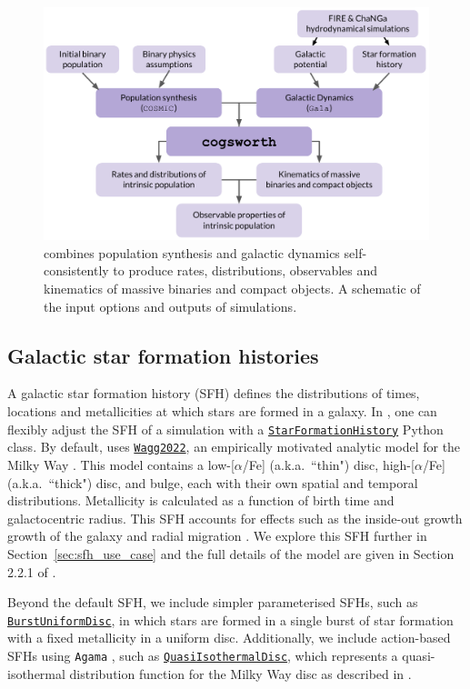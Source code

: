 \documentclass[twocolumn, twocolappendix, oneside]{aastex631}
\newcommand{\codeLink}[2]{{\href{https://cogsworth.readthedocs.io/en/latest/api/cogsworth.#2.#1.html}{\color{codecolour} \texttt{#1}}}}
\begin{document}
\begin{figure}
    \centering
    \includegraphics[width=\columnwidth]{figures/cogsworth_workflow_paper.pdf}
    \caption{\cogsworth combines population synthesis and galactic dynamics self-consistently to produce rates, distributions, observables and kinematics of massive binaries and compact objects. A schematic of the input options and outputs of \cogsworth simulations.}
    \label{fig:cogsworth_overview}
\end{figure}

\subsection{Galactic star formation histories}\label{sec:galactic_SFH}

A galactic star formation history (SFH) defines the distributions of times, locations and metallicities at which stars are formed in a galaxy. In \cogsworth, one can flexibly adjust the SFH of a simulation with a \codeLink{StarFormationHistory}{sfh} Python class. By default, \cogsworth uses \codeLink{Wagg2022}{sfh}, an empirically motivated analytic model for the Milky Way \citep{Wagg+2022}. This model contains a low-[$\alpha$/Fe] (a.k.a.~``thin")  disc, high-[$\alpha$/Fe] (a.k.a.~``thick") disc, and bulge, each with their own spatial and temporal distributions. Metallicity is calculated as a function of birth time and galactocentric radius. This SFH accounts for effects such as the inside-out growth growth of the galaxy and radial migration \citep{Frankel+2018, Frankel+2019:2019ApJ...884...99F}. We explore this SFH further in Section~\ref{sec:sfh_use_case} and the full details of the model are given in Section 2.2.1 of \citet{Wagg+2022}.

Beyond the default SFH, we include simpler parameterised SFHs, such as \codeLink{BurstUniformDisc}{sfh}, in which stars are formed in a single burst of star formation with a fixed metallicity in a uniform disc. Additionally, we include action-based SFHs using \texttt{Agama} \citep{2019MNRAS.482.1525V}, such as \codeLink{QuasiIsothermalDisc}{sfh}, which represents a quasi-isothermal distribution function for the Milky Way disc as described in \citet{Sanders+2015:2015MNRAS.449.3479S}.
\end{document}
